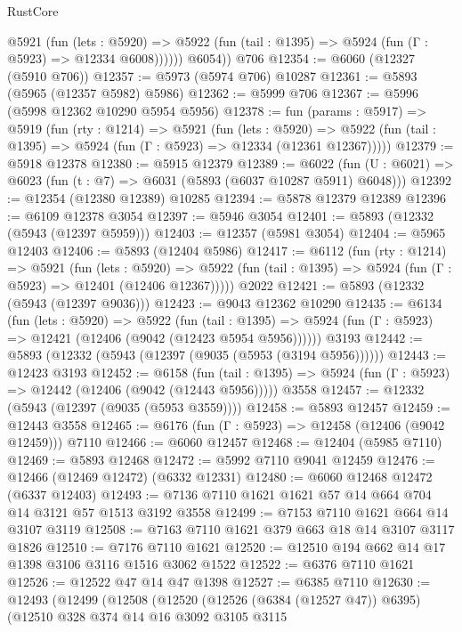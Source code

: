 \begin{lexlean}{RustCore}
\begin{coremodule}
            @5921
              (fun (lets : @5920) =>
              @5922 (fun (tail : @1395) => @5924 (fun (Γ : @5923) => @12334 @6008))))))
        @6054))
    @706
@12354 := @6060 (@12327 (@5910 @706))
@12357 := @5973 (@5974 @706) @10287
@12361 := @5893 (@5965 (@12357 @5982) @5986)
@12362 := @5999 @706
@12367 := @5996 (@5998 @12362 @10290 @5954 @5956)
@12378 := fun (params : @5917) =>
  @5919
    (fun (rty : @1214) =>
    @5921
      (fun (lets : @5920) =>
      @5922 (fun (tail : @1395) => @5924 (fun (Γ : @5923) => @12334 (@12361 @12367)))))
@12379 := @5918 @12378
@12380 := @5915 @12379
@12389 := @6022
    (fun (U : @6021) => @6023 (fun (t : @7) => @6031 (@5893 (@6037 @10287 @5911) @6048)))
@12392 := @12354 (@12380 @12389) @10285
@12394 := @5878 @12379 @12389
@12396 := @6109 @12378 @3054
@12397 := @5946 @3054
@12401 := @5893 (@12332 (@5943 (@12397 @5959)))
@12403 := @12357 (@5981 @3054)
@12404 := @5965 @12403
@12406 := @5893 (@12404 @5986)
@12417 := @6112
    (fun (rty : @1214) =>
    @5921
      (fun (lets : @5920) =>
      @5922 (fun (tail : @1395) => @5924 (fun (Γ : @5923) => @12401 (@12406 @12367)))))
    @2022
@12421 := @5893 (@12332 (@5943 (@12397 @9036)))
@12423 := @9043 @12362 @10290
@12435 := @6134
    (fun (lets : @5920) =>
    @5922
      (fun (tail : @1395) =>
      @5924 (fun (Γ : @5923) => @12421 (@12406 (@9042 (@12423 @5954 @5956))))))
    @3193
@12442 := @5893 (@12332 (@5943 (@12397 (@9035 (@5953 (@3194 @5956))))))
@12443 := @12423 @3193
@12452 := @6158
    (fun (tail : @1395) => @5924 (fun (Γ : @5923) => @12442 (@12406 (@9042 (@12443 @5956)))))
    @3558
@12457 := @12332 (@5943 (@12397 (@9035 (@5953 @3559))))
@12458 := @5893 @12457
@12459 := @12443 @3558
@12465 := @6176 (fun (Γ : @5923) => @12458 (@12406 (@9042 @12459))) @7110
@12466 := @6060 @12457
@12468 := @12404 (@5985 @7110)
@12469 := @5893 @12468
@12472 := @5992 @7110 @9041 @12459
@12476 := @12466 (@12469 @12472) (@6332 @12331)
@12480 := @6060 @12468 @12472 (@6337 @12403)
@12493 := @7136 @7110 @1621 @1621 @57 @14 @664 @704 @14 @3121 @57 @1513 @3192 @3558
@12499 := @7153 @7110 @1621 @664 @14 @3107 @3119
@12508 := @7163 @7110 @1621 @379 @663 @18 @14 @3107 @3117 @1826
@12510 := @7176 @7110 @1621
@12520 := @12510 @194 @662 @14 @17 @1398 @3106 @3116 @1516 @3062 @1522
@12522 := @6376 @7110 @1621
@12526 := @12522 @47 @14 @47 @1398
@12527 := @6385 @7110
@12630 := @12493
    (@12499
      (@12508
        (@12520
          (@12526 (@6384 (@12527 @47)) @6395)
          (@12510
            @328
            @374
            @14
            @16
            @3092
            @3105
            @3115

\end{coremodule}
\end{lexlean}
